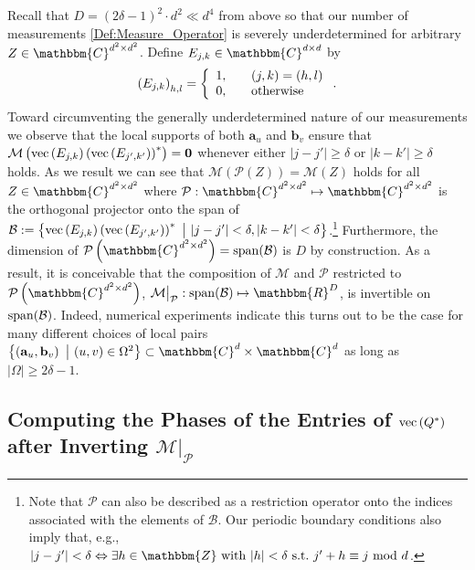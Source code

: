 \documentclass[]{spie}  %
\def \a {\mathbf a}
\def \b {\mathbf b}
\begin{document}
Recall that $D = (2\delta-1)^2 \cdot d^2 \ll d^4$ from above so that our number of measurements \eqref{Def:Measure_Operator} is severely underdetermined for arbitrary $Z \in \mathbbm{C}^{d^2 \times d^2}$.  Define $E_{j,k} \in \mathbbm{C}^{d \times d}$ by
\[ \left(E_{j,k} \right)_{h,l} = \left\{\begin{array}{r@{,\qquad}l} 1 & (j,k)=(h,l) \\ 0 & \text{otherwise} \end{array}\right..\] 
Toward circumventing the generally underdetermined nature of our measurements we observe that the local supports of both $\a_u$ and $\b_v$ ensure that $\mathcal{M}\left( {\rm vec} \left( E_{j,k} \right) \left({\rm vec} \left( E_{j',k'} \right) \right)^* \right) = {\bf 0}$ whenever either $|j - j'| \geq \delta$ or $|k - k'| \geq \delta$ holds.  As we result we can see that $\mathcal{M} \left( \mathcal{P} \left( Z \right) \right) = \mathcal{M} \left( Z \right)$ holds for all $Z \in \mathbbm{C}^{d^2 \times d^2}$ where $\mathcal{P}: \mathbbm{C}^{d^2 \times d^2} \mapsto \mathbbm{C}^{d^2 \times d^2}$ is the orthogonal projector onto the span of $\mathcal{B} := \left\{ {\rm vec} \left( E_{j,k} \right) \left({\rm vec} \left( E_{j',k'} \right) \right)^* ~{\bf \big |}~  |j - j'| < \delta, |k - k'| < \delta \right\}$.\footnote{Note that $\mathcal{P}$ can also be described as a restriction operator onto the indices associated with the elements of $\mathcal{B}$.  Our periodic boundary conditions also imply that, e.g., $|j - j'| < \delta \Leftrightarrow \exists h \in \mathbbm{Z}~{\rm with}~ |h| < \delta~{\rm s.t.}~j' + h \equiv j ~{\rm mod}~d$.}  Furthermore, the dimension of $\mathcal{P} \left( \mathbbm{C}^{d^2 \times d^2} \right) = {\rm span}(\mathcal{B})$ is $D$ by construction.  As a result, it is conceivable that the composition of $\mathcal{M}$ and $\mathcal{P}$ restricted to $\mathcal{P} \left( \mathbbm{C}^{d^2 \times d^2} \right)$, $\mathcal{M} \big|_{\mathcal{P}}: {\rm span}(\mathcal{B}) \mapsto \mathbbm{R}^D$, is invertible on ${\rm span}(\mathcal{B})$.  Indeed, numerical experiments indicate this turns out to be the case for many different choices of local pairs $\left\{ \left( \a_u, \b_v \right) ~\big|~ (u,v) \in \Omega^2 \right\} \subset \mathbbm{C}^d \times \mathbbm{C}^d$ as long as $|\Omega| \geq 2\delta-1$.

\subsection{Computing the Phases of the Entries of ${\rm vec}\left(Q^* \right)$ after Inverting $\mathcal{M} \big|_{\mathcal{P}}$}
\label{sec:Getphases}
\end{document}
